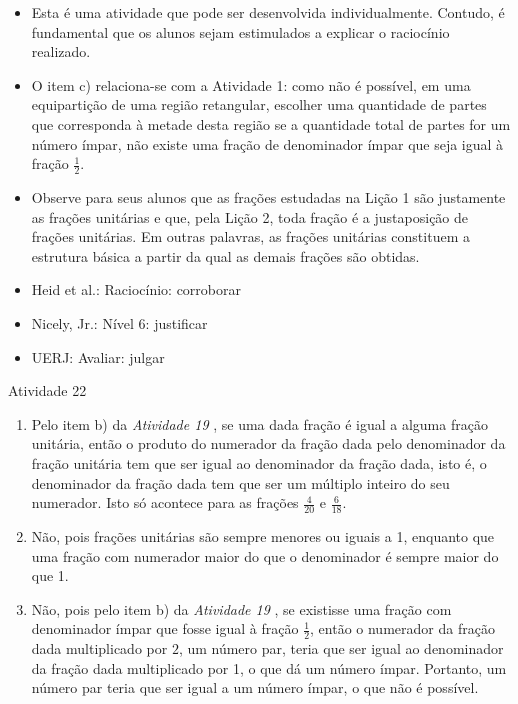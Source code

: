 \begin{multicols}{2}
\begin{itemize} %
    \item       Esta é uma atividade que pode ser desenvolvida individualmente. 
Contudo, é fundamental que os alunos sejam estimulados a explicar o raciocínio 
realizado.
    \item       O item c) relaciona-se com a Atividade 1: como não é possível, 
em uma equipartição de uma região retangular, escolher uma quantidade de partes 
que corresponda à metade desta região se a quantidade total de partes for um 
número ímpar, não existe uma fração de denominador ímpar que seja igual à fração 
      $\frac{1}{2}$.
    \item       Observe para seus alunos que as frações estudadas na Lição 1 são 
justamente as frações unitárias e que, pela Lição 2, toda fração é a 
justaposição de frações unitárias. Em outras palavras, as frações unitárias 
constituem a estrutura básica a partir da qual as demais frações são obtidas.
\end{itemize} %
  
  
   \vspace{.1cm}
  
 \vspace{.1cm}
   
\begin{itemize} %
    \item       Heid et al.: Raciocínio: corroborar
    \item       Nicely, Jr.: Nível 6: justificar
    \item       UERJ: Avaliar: julgar
\end{itemize} %
  
\begin{resposta*}{Atividade 22}
\begin{enumerate} [\quad a)] %
    \item       Pelo item b) da \emph{Atividade 19}      , se uma dada fração é 
igual a alguma fração unitária, então o produto do numerador da fração dada pelo 
denominador da fração unitária tem que ser igual ao denominador da fração dada, 
isto é, o denominador da fração dada tem que ser um múltiplo inteiro do seu 
numerador. Isto só acontece para as frações       $\frac{4}{20}$       e       
$\frac{6}{18}$.
    \item       Não, pois frações unitárias são sempre menores ou iguais a 1, 
enquanto que uma fração com numerador maior do que o denominador é sempre maior 
do que 1.
    \item       Não, pois pelo item b) da \emph{Atividade 19}      , se 
existisse uma fração com denominador ímpar que fosse igual à fração       
$\frac{1}{2}$, então o numerador da fração dada multiplicado por       $2$, um 
número par, teria que ser igual ao denominador da fração dada multiplicado por 
1, o que dá um número ímpar. Portanto, um número par teria que ser igual a um 
número ímpar, o que não é possível. 
\end{enumerate} %
  

\end{resposta*}
\end{multicols}
